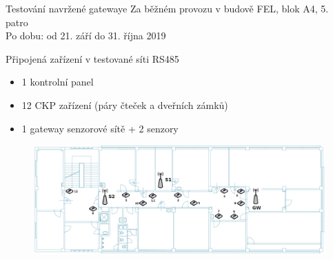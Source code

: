 \documentclass{beamer}
\begin{document}
\begin{frame} {Testování navržené gatewaye}
	Za běžném provozu v budově FEL, blok A4, 5. patro \\
	Po dobu: od 21. září do 31. října 2019

	Připojená zařízení v testované síti RS485
	\begin{itemize}
		\item 1 kontrolní panel
		\item 12 CKP zařízení (páry čteček a dveřních zámků)
		\item 1 gateway senzorové sítě + 2 senzory
	\end{itemize}

	\begin{figure}[!h]
		\centering
		\includegraphics[width=1\textwidth]{5patro}
	\end{figure}

\end{frame}
\end{document}
